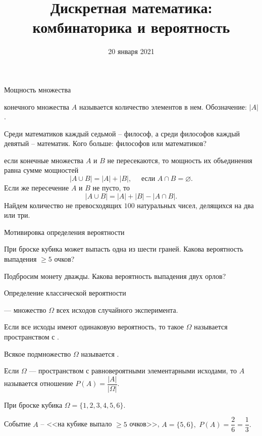 

\date{20 января 2021}		%
\setcounter{s}{2}			%




\title{Дискретная математика:\\
комбинаторика и вероятность}


\begin{frame}
  \titlepage
\end{frame}


\begin{frame}{Мощность множества}

 {} конечного множества $A$ называется количество элементов в нем. Обозначение: $|A|$.

\exmpl Среди математиков каждый седьмой -- философ, а среди философов каждый девятый -- математик. Кого больше: философов или математиков?


 если конечные множества $A$ и $B$ не пересекаются,
то мощность их объединения равна сумме мощностей
$$|A \cup B|=|A|+|B|,\quad \text { если } A \cap B=\varnothing.$$
Если же пересечение $A$ и $B$ не пусто, то
$$|A \cup B|=|A|+|B|- |A \cap B|.$$
\exmpl Найдем количество не превосходящих $100$ натуральных чисел, делящихся на два или три.


\end{frame}


\begin{frame}{Мотивировка определения вероятности}


\exmpl При броске кубика может выпасть одна из шести граней. Какова вероятность выпадения $\geqslant 5$ очков?

\exmpl Подбросим монету дважды.
Какова вероятность выпадения двух орлов?


\end{frame}


\begin{frame}{Определение классической вероятности}

 {} — множество $\Omega$ всех исходов случайного эксперимента.

Если все исходы имеют одинаковую вероятность, то такое $\Omega$ называется пространством с .

 Всякое подмножество $\Omega$ называется .

 Если $\Omega$ --- пространством с равновероятными элементарными исходами, то  $A$ называется отношение $P(A)=\dfrac{|A|}{|\Omega|}.$

\exmpl При броске кубика $\Omega=\{1,2,3,4,5,6\}.$

Событие $A$ -- <<на кубике выпало $\geqslant 5$ очков>>, $A=\{5,6\},$ $P(A)=\dfrac{2}{6}=\dfrac 13.$

\end{frame}

